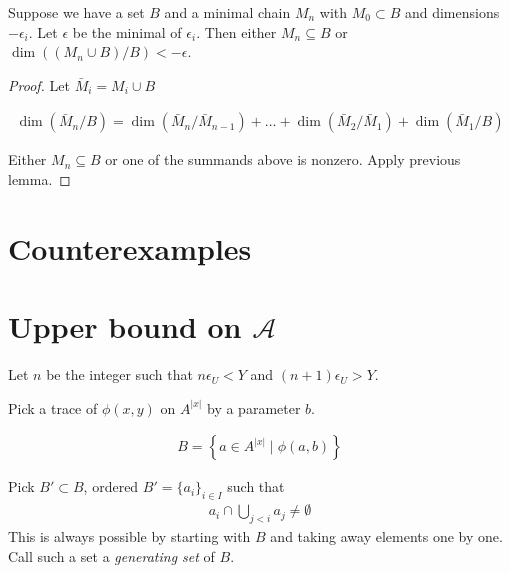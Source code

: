 \documentclass{amsart}
\renewcommand{\AA}{\mathscr A}
\newcommand{\curly}[1]{\left\{#1\right\}}
\begin{document}
\begin{Lemma}	\label{chain_lemma}
	Suppose we have a set $B$ and a minimal chain $M_n$ with $M_0 \subset B$ and dimensions $-\epsilon_i$.
Let $\epsilon$ be the minimal of $\epsilon_i$.
Then either $M_n \subseteq B$ or $\dim((M_n \cup B)/B) < -\epsilon$.
\end{Lemma}


\begin{proof}
	Let $\bar M_i = M_i \cup B$

	\begin{align*}
		\dim(\bar M_n/B) = \dim(\bar M_n/\bar M_{n-1}) + \ldots + \dim(\bar M_2/\bar M_1) + \dim(\bar M_1/B)
	\end{align*}

	Either $M_n \subseteq B$ or one of the summands above is nonzero.
	Apply previous lemma.
\end{proof}

\section{Counterexamples}



\section{Upper bound on $\AA$}

Let $n$ be the integer such that $n \epsilon_U < Y$ and $(n+1) \epsilon_U > Y$.

Pick a trace of $\phi(x,y)$ on $A^{|x|}$ by a parameter $b$.

\begin{align*}
	B = \curly{a \in A^{|x|} \mid \phi(a, b)}
\end{align*}

Pick $B' \subset B$, ordered $B' = \{a_i\}_{i \in I}$ such that
\begin{align*}
	a_i \cap \bigcup_{j < i} a_j \neq \emptyset
\end{align*}
This is always possible by starting with $B$ and taking away elements one by one.
Call such a set a \emph{generating set} of $B$.
\end{document}
